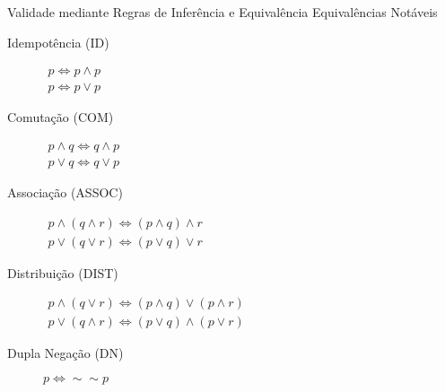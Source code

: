 \begin{frame}[t]{Validade mediante Regras de Inferência e Equivalência}	
	Equivalências Notáveis
	
	\begin{description}
	\item[Idempotência (ID)] $\begin{array}{l}p \Leftrightarrow p \wedge p\\p \Leftrightarrow p \vee p\end{array}$
	
	\item[Comutação (COM)] $\begin{array}{l}p \wedge q \Leftrightarrow q \wedge p\\p \vee q \Leftrightarrow q \vee p\end{array}$
	
	\item[Associação (ASSOC)] $\begin{array}{l}p \wedge (q \wedge r) \Leftrightarrow (p \wedge q) \wedge r\\p \vee (q \vee r) \Leftrightarrow (p \vee q) \vee r\end{array}$
	
	\item[Distribuição (DIST)] $\begin{array}{l}p \wedge (q \vee r) \Leftrightarrow (p \wedge q) \vee (p \wedge r)\\p \vee (q \wedge r) \Leftrightarrow (p \vee q) \wedge (p \vee r)\end{array}$
	
	\item[Dupla Negação (DN)] $p \Leftrightarrow\sim\sim p$
	\end{description}
\end{frame}


